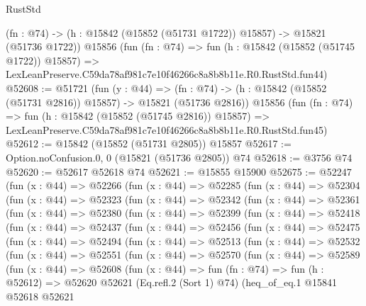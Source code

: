 \begin{lexlean}{RustStd}
\begin{coremodule}
    (fn : @74) -> (h : @15842 (@15852 (@51731 @1722)) @15857) -> @15821 (@51736 @1722))
    @15856
    (fun (fn : @74) =>
    fun (h : @15842 (@15852 (@51745 @1722)) @15857) =>
    LexLeanPreserve.C59da78af981c7e10f46266c8a8b8b11e.R0.RustStd.fun44)
@52608 := @51721
    (fun (y : @44) =>
    (fn : @74) -> (h : @15842 (@15852 (@51731 @2816)) @15857) -> @15821 (@51736 @2816))
    @15856
    (fun (fn : @74) =>
    fun (h : @15842 (@15852 (@51745 @2816)) @15857) =>
    LexLeanPreserve.C59da78af981c7e10f46266c8a8b8b11e.R0.RustStd.fun45)
@52612 := @15842 (@15852 (@51731 @2805)) @15857
@52617 := Option.noConfusion.{0, 0} (@15821 (@51736 @2805)) @74
@52618 := @3756 @74
@52620 := @52617 @52618 @74
@52621 := @15855 @15900
@52675 := @52247
    (fun (x : @44) =>
    @52266
      (fun (x : @44) =>
      @52285
        (fun (x : @44) =>
        @52304
          (fun (x : @44) =>
          @52323
            (fun (x : @44) =>
            @52342
              (fun (x : @44) =>
              @52361
                (fun (x : @44) =>
                @52380
                  (fun (x : @44) =>
                  @52399
                    (fun (x : @44) =>
                    @52418
                      (fun (x : @44) =>
                      @52437
                        (fun (x : @44) =>
                        @52456
                          (fun (x : @44) =>
                          @52475
                            (fun (x : @44) =>
                            @52494
                              (fun (x : @44) =>
                              @52513
                                (fun (x : @44) =>
                                @52532
                                  (fun (x : @44) =>
                                  @52551
                                    (fun (x : @44) =>
                                    @52570
                                      (fun (x : @44) =>
                                      @52589
                                        (fun (x : @44) =>
                                        @52608
                                          (fun (x : @44) =>
                                          fun (fn : @74) =>
                                          fun (h : @52612) =>
                                          @52620
                                            @52621
                                            (Eq.refl.{2} (Sort 1) @74)
                                            (heq_of_eq.{1}
                                              @15841
                                              @52618
                                              @52621

\end{coremodule}
\end{lexlean}
